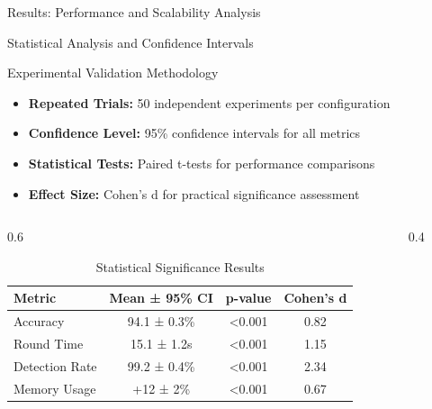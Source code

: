 \documentclass[aspectratio=169,11pt]{beamer}
\begin{document}
\begin{frame}{Results: Performance and Scalability Analysis}
\end{frame}

\begin{frame}{Statistical Analysis and Confidence Intervals}

\begin{block}{Experimental Validation Methodology}
\begin{itemize}
\item \textbf{Repeated Trials:} 50 independent experiments per configuration
\item \textbf{Confidence Level:} 95\% confidence intervals for all metrics
\item \textbf{Statistical Tests:} Paired t-tests for performance comparisons
\item \textbf{Effect Size:} Cohen's d for practical significance assessment
\end{itemize}
\end{block}

\begin{columns}
\begin{column}{0.6\textwidth}
\begin{table}[h]
\centering
\footnotesize
\caption{Statistical Significance Results}
\begin{tabular}{@{}lccc@{}}
\toprule
\textbf{Metric} & \textbf{Mean ± 95\% CI} & \textbf{p-value} & \textbf{Cohen's d} \\
\midrule
Accuracy & 94.1 ± 0.3\% & <0.001 & 0.82 \\
Round Time & 15.1 ± 1.2s & <0.001 & 1.15 \\
Detection Rate & 99.2 ± 0.4\% & <0.001 & 2.34 \\
Memory Usage & +12 ± 2\% & <0.001 & 0.67 \\
\bottomrule
\end{tabular}
\end{table}
\end{column}

\begin{column}{0.4\textwidth}
\end{column}
\end{columns}


\end{frame}
\end{document}
